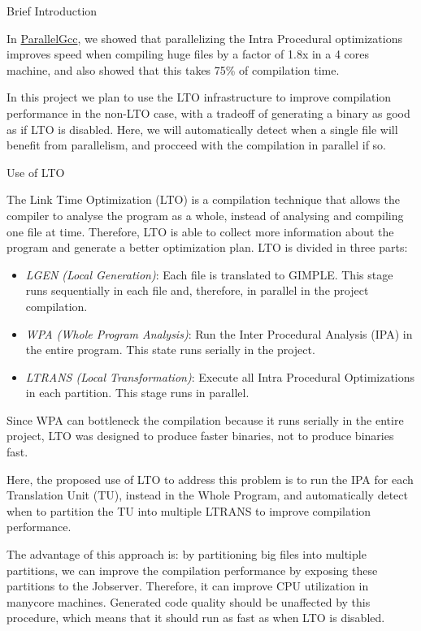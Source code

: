 \documentclass[12pt]{article}
\begin{document}
\begin{section}{Brief Introduction}

In \href{https://gcc.gnu.org/wiki/ParallelGcc}{ParallelGcc}, we showed that parallelizing the Intra Procedural optimizations
improves speed when compiling huge files by a factor of 1.8x in a 4 cores
    machine, and also showed that this takes 75\% of compilation time.

In this project we plan to use the LTO infrastructure to improve
compilation performance in the non-LTO case, with a tradeoff of generating
a binary as good as if LTO is disabled. Here, we will automatically detect
when a single file will benefit from parallelism, and procceed with the
compilation in parallel if so.

\begin{section}{Use of LTO}

The Link Time Optimization (LTO) is a compilation technique that allows the
compiler to analyse the program as a whole, instead of analysing and compiling
one file at time. Therefore, LTO is able to collect more information about
the program and generate a better optimization plan. LTO is divided in three
parts:

\begin{itemize}
    \item \emph{LGEN (Local Generation)}: Each file is translated to GIMPLE. This
        stage runs sequentially in each file and, therefore, in parallel in
        the project compilation.

    \item \emph{WPA (Whole Program Analysis)}: Run the Inter Procedural Analysis (IPA) in the
        entire program. This state runs serially in the project.

    \item \emph{LTRANS (Local Transformation)}: Execute all Intra Procedural Optimizations in
        each partition. This stage runs in parallel.
\end{itemize}

Since WPA can bottleneck the compilation because it runs serially in the entire
project, LTO was designed to produce faster binaries, not to produce binaries
fast.

Here, the proposed use of LTO to address this problem is to run the IPA
for each Translation Unit (TU), instead in the Whole Program, and automatically
detect when to partition the TU into multiple LTRANS to improve compilation performance.

The advantage of this approach is: by partitioning big files into multiple
partitions, we can improve the compilation performance by exposing these
partitions to the Jobserver. Therefore, it can improve CPU utilization in
manycore machines.  Generated code quality should be unaffected by this
procedure, which means that it should run as fast as when LTO is disabled.




\end{section}
\end{section}
\end{document}
